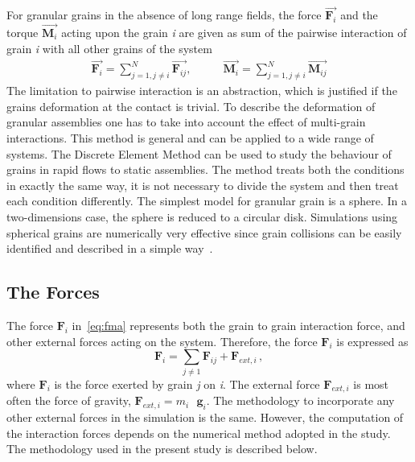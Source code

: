 For granular grains in the absence of long range fields, the force  
$\overrightarrow{\mathbf{F}_{i}}$ and the torque  
$\overrightarrow{\mathbf{M}_{i}}$ acting upon the grain \textit{i} are given as 
sum of the pairwise interaction of grain \textit{i} with 
all other grains of the system
%
\begin{align}
   \overrightarrow{{\mathbf{F}}_i}=\sum\limits_{j=1,j\ne 
   i}^{N}{\overrightarrow{\mathbf{F}_{ij}}}, \qquad 
   &\overrightarrow{\mathbf{M}_{i}}=\sum\limits_{j=1,j\ne 
   i}^{N}{\overrightarrow{\mathbf{M}_{ij}}}
\end{align}
%
The limitation to pairwise interaction is an abstraction, which is justified 
if the grains deformation at the contact is trivial. To describe the 
deformation of granular assemblies one has to take into account the effect of 
multi-grain interactions. This method is general and can be applied to a wide 
range of systems. The Discrete Element Method can be used to study the 
behaviour of grains in rapid flows to static assemblies. The method treats 
both the conditions in exactly the same way, it is not necessary to divide the 
system and then treat each condition differently. The simplest model for 
granular grain is a sphere. In a two-dimensions case, the sphere is reduced to 
a circular disk. Simulations using spherical grains are numerically very 
effective since grain collisions can be easily identified and described in 
a simple way~\citep{Poschel2005}.

% 

\subsection{The Forces}

The force $\mathbf{F}_{\mathit{i}}$ in~\cref{eq:fma} represents both the grain 
to grain interaction force, and other external forces acting on the system. 
Therefore, the force $\mathbf{F}_{\mathit{i}}$ is expressed as
%
\begin{equation} \label{eq:f}
 \mathbf{{F}}_{i}=\sum\limits_{j\ne 1}{\mathbf{{F}}_{ij}+\mathbf{{F}}_{ext, 
 i}}\,,
\end{equation}
%
where $\mathbf{F}_{\mathit{i}}$ is the force exerted by grain \textit{j} on 
\textit{i}. The external force $\mathbf{F}_{\mathit{ext,i}}$ is most often the 
force of gravity, $\mathbf{F}_{\mathit{ext,i}} = m_{\mathit{i}} \mbox{ 
}\mathbf{g}_{\mathit{i}}$. The methodology to incorporate any other external 
forces in the simulation is the same. However, the computation of the 
interaction forces depends on the numerical method adopted in the study. 
The methodology used in the present study is described below. 

